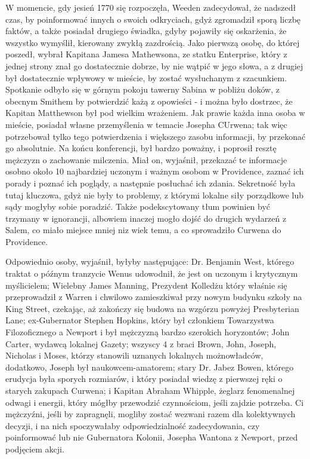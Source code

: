 W momencie, gdy jesień 1770 się rozpoczęła, Weeden zadecydował, że nadszedł czas, by poinformować innych o swoich odkryciach, gdyż zgromadził sporą liczbę faktów, a także posiadał drugiego świadka, gdyby pojawiły się oskarżenia, że wszystko wymyślił, kierowany zwykłą zazdrością. Jako pierwszą osobę, do której poszedł, wybrał Kapitana Jamesa Mathewsona, ze statku Enterprise, który z jednej strony znał go dostatecznie dobrze, by nie wątpić w jego słowa, a z drugiej był dostatecznie wpływowy w mieście, by zostać wysłuchanym z szacunkiem. Spotkanie odbyło się w górnym pokoju tawerny Sabina w pobliżu doków, z obecnym Smithem by potwierdzić każą z opowieści - i można było dostrzec, że Kapitan Matthewson był pod wielkim wrażeniem. Jak prawie każda inna osoba w mieście, posiadał własne przemyślenia w temacie Josepha CUrwena; tak więc potrzebował tylko tego potwierdzenia i większego zasobu informacji, by przekonać go absolutnie. Na końcu konferencji, był bardzo poważny, i poprosił resztę mężczyzn o zachowanie milczenia. Miał on, wyjaśnił, przekazać te informacje osobno około 10 najbardziej uczonym i ważnym osobom w Providence, zaznać ich porady i poznać ich poglądy, a następnie posłuchać ich zdania. Sekretność była tutaj kluczowa, gdyż nie były to problemy, z którymi lokalne siły porządkowe lub sądy mogłyby sobie poradzić. Także podekscytowany tłum powinien być trzymany w ignorancji, albowiem inaczej mogło dojść do drugich wydarzeń z Salem, co miało miejsce mniej niz wiek temu, a co sprowadziło Curwena do Providence.

Odpowiednio osoby, wyjaśnił, byłyby następujące: Dr. Benjamin West, którego traktat o późnym tranzycie Wenus udowodnił, że jest on uczonym i krytycznym myślicielem; Wielebny James Manning, Prezydent Kolledżu który właśnie się przeprowadził z Warren i chwilowo zamieszkiwał przy nowym budynku szkoły na King Street, czekając, aż zakończy się budowa na wzgórzu powyżej Presbyterian Lane; ex-Gubernator Stephen Hopkins, który był członkiem Towarzystwa Filozoficznego a Newport i był mężczyzną bardzo szerokich horyzontów; John Carter, wydawcą lokalnej Gazety; wszyscy 4 z braci Brown, John, Joseph, Nicholas i Moses, którzy stanowili uznanych lokalnych możnowładców, dodatkowo, Joseph był naukowcem-amatorem; stary Dr. Jabez Bowen, którego erudycja była sporych rozmiarów, i który posiadał wiedzę z pierwszej ręki o starych zakupach Curwena; i Kapitan Abraham Whipple, żeglarz fenomenalnej odwagi i energii, który mógłby przewodzić czynnościom, jeśli zajdzie potrzeba. Ci mężczyźni, jeśli by zapragnęli, mogliby zostać wezwani razem dla kolektywnych decyzji, i na nich spoczywałaby odpowiedzialność zadecydowania, czy poinformować lub nie Gubernatora Kolonii, Josepha Wantona z Newport, przed podjęciem akcji. 

